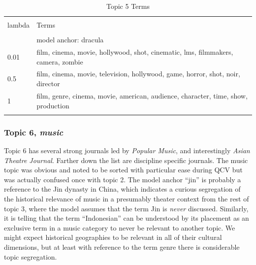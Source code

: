 \documentclass[]{book}
\theoremstyle{definition}
\theoremstyle{definition}
\theoremstyle{definition}
\theoremstyle{remark}
\begin{document}
\begin{table}[!htbp] \centering 
  \caption{Topic 5 Terms} 
  \label{tab:t5d} 
\begin{tabularx}{\textwidth}{@{\extracolsep{5pt}} lY} 
\\[-1.8ex]\hline 
\hline \\[-1.8ex] 
lambda & Terms \\ 
\hline \\[-1.8ex] 
 & model anchor: dracula \\ 
0.01 & film, cinema, movie, hollywood, shot, cinematic, lms, filmmakers, camera, zombie \\ 
0.5 & film, cinema, movie, television, hollywood, game, horror, shot, noir, director \\ 
1 & film, genre, cinema, movie, american, audience, character, time, show, production \\ 
\hline \\[-1.8ex] 
\end{tabularx} 
\end{table}

\hypertarget{topic-6-music}{%
\subsubsection{\texorpdfstring{Topic 6,
\emph{music}}{Topic 6, music}}\label{topic-6-music}}

Topic 6 has several strong journals led by \emph{Popular Music}, and
interestingly \emph{Asian Theatre Journal}. Farther down the list are
discipline specific journals. The music topic was obvious and noted to
be sorted with particular ease during QCV but was actually confused once
with topic 2. The model anchor ``jin'' is probably a reference to the
Jin dynasty in China, which indicates a curious segregation of the
historical relevance of music in a presumably theater context from the
rest of topic 3, where the model assumes that the term Jin is
\emph{never} discussed. Similarly, it is telling that the term
``Indonesian'' can be understood by its placement as an exclusive term
in a music category to never be relevant to another topic. We might
expect historical geographies to be relevant in all of their cultural
dimensions, but at least with reference to the term genre there is
considerable topic segregation.
\end{document}
